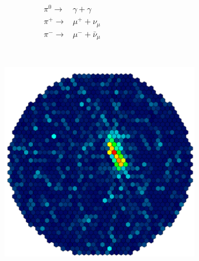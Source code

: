 \documentclass[aspectratio=1610, professionalfonts, 9pt]{beamer}
\begin{document}
\begin{frame}
\begin{columns}[onlytextwidth]
\begin{figure}
	  \cite{corsika}
	\end{figure}
	\begin{eqnarray*}
	  \pi^{0} \rightarrow& \gamma + \gamma \\
	  \pi^{+} \rightarrow& \mu^{+} + \nu_{\mu} \\
	  \pi^{-} \rightarrow& \mu^{-} + \bar{\nu}_{\mu}
	\end{eqnarray*}
  \end{columns}
\end{frame}

\begin{frame}
  \begin{columns}[onlytextwidth]
	\begin{figure}
	  \centering
	  \includegraphics[height=0.8\textheight]{./images/Gamma.pdf}
	  \cite{FACT}
	\end{figure}
	\begin{figure}
	  \centering

\end{figure}
\end{columns}
\end{frame}
\end{document}
